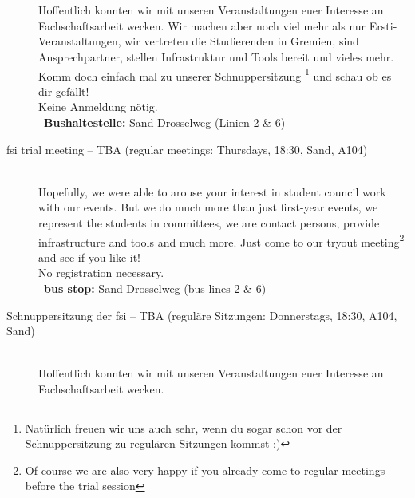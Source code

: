 \begin{description}
\ifkogwiss
    \vspace{-2.07182\baselineskip} \ \\ %
     \item[\parbox{\linewidth}{Schnuppersitzung der fsk -- Donnerstag, 20. November \YEAR, 18:30 \\ (reguläre Sitzungen: Donnerstags, 18:30, vor dem Kogni Zimmer), Sand}]\ \vspace{.355\baselineskip} \\
        Hoffentlich konnten wir mit unseren Veranstaltungen euer Interesse an Fachschaftsarbeit wecken.
        Wir machen aber noch viel mehr als nur Ersti-Veranstaltungen, wir vertreten die Studierenden in Gremien,
        sind Ansprechpartner, stellen Infrastruktur und Tools bereit und vieles mehr.
     Komm doch einfach mal zu unserer Schnuppersitzung
     \footnote{Natürlich freuen wir uns auch sehr, wenn du sogar schon vor der Schnuppersitzung zu regulären Sitzungen kommst :)}
        und schau ob es dir gefällt!\\
        Keine Anmeldung nötig.\\
        ~\textbf{Bushaltestelle:} Sand Drosselweg (Linien 2 \& 6)
\else
    \ifml
        \item[fsi trial meeting -- TBA (regular meetings: Thursdays, 18:30, Sand, A104)]~\\%
        Hopefully, we were able to arouse your interest in student council work with our events.
        But we do much more than just first-year events, we represent the students in committees,
        we are contact persons, provide infrastructure and tools and much more.
        Just come to our tryout meeting\footnote{Of course we are also very happy if you already come to regular meetings before the trial session}
        and see if you like it!\\
        No registration necessary.\\
        ~\textbf{bus stop:} Sand Drosselweg (bus lines 2 \& 6)
    \else
        \item[Schnuppersitzung der fsi -- TBA (reguläre Sitzungen: Donnerstags, 18:30, A104, Sand)]~\\%
        Hoffentlich konnten wir mit unseren Veranstaltungen euer Interesse an Fachschaftsarbeit wecken.

\end{description}
